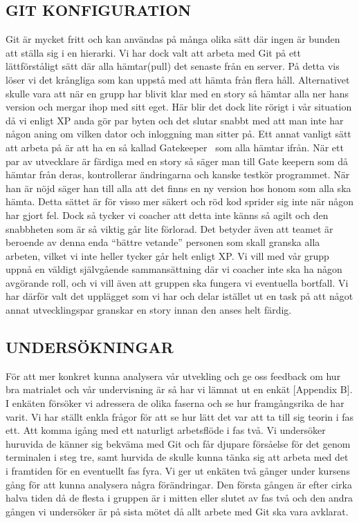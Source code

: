 \subsection{GIT KONFIGURATION}

Git är mycket fritt och kan användas på många olika sätt där ingen är bunden att ställa sig i en hierarki. Vi har dock valt att arbeta med Git på ett lättförståligt sätt där alla hämtar(pull) det senaste från en server. På detta vis löser vi det krångliga som kan uppstå med att hämta från flera håll. Alternativet skulle vara att när en grupp har blivit klar med en story så hämtar alla ner hans version och mergar ihop med sitt eget. Här blir det dock lite rörigt i vår situation då vi enligt XP anda gör par byten och det slutar snabbt med att man inte har någon aning om vilken dator och inloggning man sitter på. Ett annat vanligt sätt att arbeta på är att ha en så kallad Gatekeeper~\cite{Gatekeeper} som alla hämtar ifrån. När ett par av utvecklare är färdiga med en story så säger man till Gate keepern som då hämtar från deras, kontrollerar ändringarna och kanske testkör programmet. När han är nöjd säger han till alla att det finns en ny version hos honom som alla ska hämta. Detta sättet är för visso mer säkert och röd kod sprider sig inte när någon har gjort fel. Dock så tycker vi coacher att detta inte känns så agilt och den snabbheten som är så viktig går lite förlorad. Det betyder även att teamet är beroende av denna enda “bättre vetande” personen som skall granska alla arbeten, vilket vi inte heller tycker går helt enligt XP. Vi vill med vår grupp uppnå en väldigt självgående sammansättning där vi coacher inte ska ha någon avgörande roll, och vi vill även att gruppen ska fungera vi eventuella bortfall. 
Vi har därför valt det upplägget som vi har och delar istället ut en task på att något annat utvecklingspar granskar en story innan den anses helt färdig. 


\subsection{UNDERSÖKNINGAR}

För att mer konkret kunna analysera vår utvekling och ge oss feedback om hur bra matrialet och vår undervisning är så har vi lämnat ut en enkät [Appendix B]. I enkäten försöker vi adressera de olika faserna och se hur framgångsrika de har varit. Vi har ställt enkla frågor för att se hur lätt det var att ta till sig teorin i fas ett. Att komma igång med ett naturligt arbetsflöde i fas två. Vi undersöker huruvida de känner sig bekväma med Git och får djupare försåelse för det genom terminalen i steg tre, samt hurvida de skulle kunna tänka sig att arbeta med det i framtiden för en eventuellt fas fyra. Vi ger ut enkäten två gånger under kursens gång för att kunna analysera några förändringar. Den första gången är efter cirka halva tiden då de flesta i gruppen är i mitten eller slutet av fas två och den andra gången vi undersöker är på sista mötet då allt arbete med Git ska vara avklarat. 